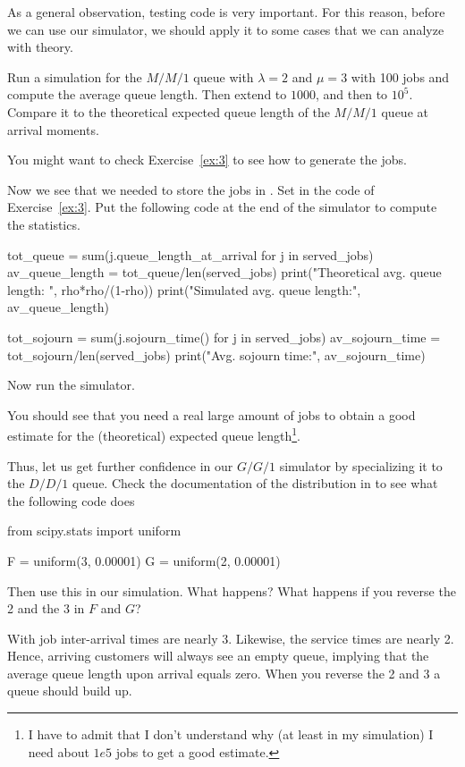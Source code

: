 As a general observation, testing code is very important. For this reason, before we can use our simulator, we should apply it to some cases that we can analyze with theory. 

\begin{exercise}
  Run a simulation for the $M/M/1$ queue with $\lambda=2$ and $\mu=3$ with 100 jobs and compute the average queue length. Then extend to $1000$, and then to $10^5$. Compare it to the theoretical expected queue length of the $M/M/1$ queue at arrival moments.

  \begin{hint}
You might want to check Exercise~\ref{ex:3} to see how to generate the jobs.
    \end{hint}
  \begin{solution}
Now we see that we needed to store the jobs in . Set  in the code of Exercise~\ref{ex:3}. Put the following code at the end of the simulator to compute the statistics. 
    \begin{pyblock}

tot_queue = sum(j.queue_length_at_arrival for j in served_jobs)
av_queue_length = tot_queue/len(served_jobs)
print("Theoretical avg. queue length: ", rho*rho/(1-rho))
print("Simulated avg. queue length:", av_queue_length)
      
tot_sojourn = sum(j.sojourn_time() for j in served_jobs)
av_sojourn_time = tot_sojourn/len(served_jobs)
print("Avg. sojourn time:", av_sojourn_time)
\end{pyblock}

Now run the simulator.

You should see that you need a real large amount of jobs to obtain a good estimate for the (theoretical) expected queue length\footnote{I have to admit that I don't understand why (at least in my simulation) I need about $1e5$ jobs to get a good estimate.}. 

  \end{solution}
\end{exercise}

\begin{exercise}
 Thus, let us get further confidence in our $G/G/1$ simulator by specializing it to the $D/D/1$ queue. Check the documentation of the  distribution in  to see what the following code does
  \begin{pyblock}
from scipy.stats import uniform

F = uniform(3, 0.00001)
G = uniform(2, 0.00001)
\end{pyblock}

Then use this in our simulation. What happens? What happens if you reverse the 2 and the 3 in $F$ and $G$?
\begin{solution}
  With  job inter-arrival times are nearly 3.
  Likewise, the service times are nearly 2.
  Hence, arriving customers will always see an empty queue, implying that the average queue length upon arrival equals zero.
  When you reverse the 2 and 3 a queue should build up.
\end{solution}
\end{exercise}


